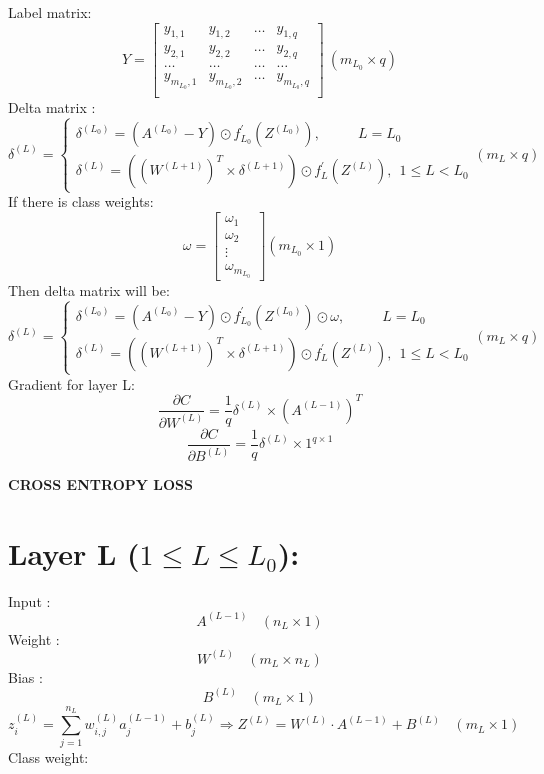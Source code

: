 \documentclass{article}
\begin{document}
    Label matrix:
    \[
        Y = 
        \begin{bmatrix}
            y_{1, 1} & y_{1, 2} & \hdots & y_{1, q} \\
            y_{2, 1} & y_{2, 2} & \hdots & y_{2, q} \\
            \hdots & \hdots & \hdots & \hdots \\
            y_{m_{L_0}, 1} & y_{m_{L_0}, 2} & \hdots & y_{m_{L_0}, q} \\
        \end{bmatrix} \ (m_{L_0} \times q)
    \]
    Delta matrix : 
    \[
        \delta^{(L)} = 
        \begin{cases}
            \delta^{(L_0)} = \left(A^{(L_0)} - Y\right) \odot f^{\prime}_{L_0}\left(Z^{(L_0)}\right), \ \ \ \ \ \ \ \ \ \ \ \ L = L_0 \\
            \delta^{(L)} = \left(\left(W^{(L + 1)}\right)^T \times \delta^{(L + 1)} \right) \odot
            f^{\prime}_{L}\left(Z^{(L)}\right), \ \ 1 \le L < L_0
        \end{cases} (m_{L} \times q)
    \]
    If there is class weights: 
    \[
        \omega = \begin{bmatrix}
            \omega_1 \\
            \omega_2 \\
            \vdots \\
            \omega_{m_{L_0}}
        \end{bmatrix} (m_{L_0} \times 1)
    \]
    Then delta matrix will be:
    \[
        \delta^{(L)} = 
        \begin{cases}
            \delta^{(L_0)} = \left(A^{(L_0)} - Y\right) \odot f^{\prime}_{L_0}\left(Z^{(L_0)}\right) \odot \omega, \ \ \ \ \ \ \ \ \ \ \ \ L = L_0 \\
            \delta^{(L)} = \left(\left(W^{(L + 1)}\right)^T \times \delta^{(L + 1)} \right) \odot
            f^{\prime}_{L}\left(Z^{(L)}\right), \ \ 1 \le L < L_0
        \end{cases} (m_{L} \times q)
    \]
    Gradient for layer L:
    \[
        \frac{\partial C}{\partial W^{(L)}} = \frac{1}{q}\delta^{(L)} \times \left(A^{(L-1)}\right)^T
    \]
    \[
        \frac{\partial C}{\partial B^{(L)}} = \frac{1}{q}\delta^{(L)} \times 1^{q \times 1}
    \]
    \begin{center}
        {\Large \textbf{CROSS ENTROPY LOSS}}
    \end{center}
    \section*{Layer L ($1 \leq L \leq L_0$): }
    Input :
    \[
        A^{(L-1)} \ \ \ \ (n_L \times 1)
    \]
    Weight : 
    \[
        W^{(L)} \ \ \ \ (m_L \times n_L) 
    \]
    Bias : 
    \[
        B^{(L)} \ \ \ \ (m_L \times 1)
    \]
    \[
        z^{(L)}_i = \sum_{j = 1}^{n_L}w^{(L)}_{i, j}a^{(L-1)}_j + b^{(L)}_j
        \Rightarrow Z^{(L)} = W^{(L)} \cdot A^{(L-1)} + B^{(L)} \ \ \ \ (m_L \times 1)
    \]
    Class weight:
\end{document}
